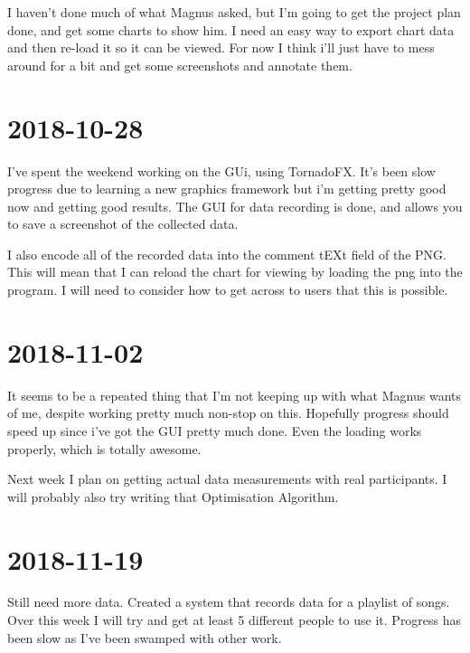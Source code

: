 \documentclass{article}
\begin{document}
	I haven't done much of what Magnus asked, but I'm going to get the project plan done, and get some charts to show him. I need an easy way to export chart data and then re-load it so it can be viewed. For now I think i'll just have to mess around for a bit and get some screenshots and annotate them.
	
	\section{2018-10-28}
	I've spent the weekend working on the GUi, using TornadoFX. It's been slow progress due to learning a new graphics framework but i'm getting pretty good now and getting good results. The GUI for data recording is done, and allows you to save a screenshot of the collected data.
	
	I also encode all of the recorded data into the comment tEXt field of the PNG. This will mean that I can reload the chart for viewing by loading the png into the program. I will need to consider how to get across to users that this is possible.
	
	\section{2018-11-02}
	It seems to be a repeated thing that I'm not keeping up with what Magnus wants of me, despite working pretty much non-stop on this. Hopefully progress should speed up since i've got the GUI pretty much done. Even the loading works properly, which is totally awesome.
	
	Next week I plan on getting actual data measurements with real participants. I will probably also try writing that Optimisation Algorithm.
	
	\section{2018-11-19}
	Still need more data. Created a system that records data for a playlist of songs. Over this week I will try and get at least 5 different people to use it. Progress has been slow as I've been swamped with other work.
		
\end{document}
